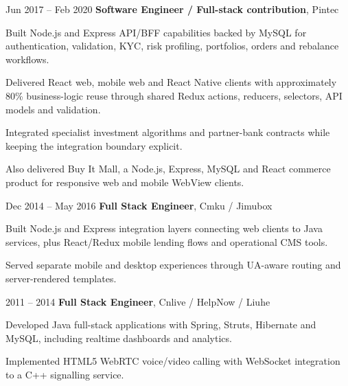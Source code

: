 \documentclass[10pt, letterpaper]{article}
\begin{document}
        \vspace{0.2 cm}
        \begin{twocolentry}{Jun 2017 -- Feb 2020}
            \textbf{Software Engineer / Full-stack contribution}, Pintec
        \end{twocolentry}
        \begin{onecolentry}
            \begin{highlights}
                \item Built Node.js and Express API/BFF capabilities backed by MySQL for authentication, validation, KYC, risk profiling, portfolios, orders and rebalance workflows.
                \item Delivered React web, mobile web and React Native clients with approximately 80\% business-logic reuse through shared Redux actions, reducers, selectors, API models and validation.
                \item Integrated specialist investment algorithms and partner-bank contracts while keeping the integration boundary explicit.
                \item Also delivered Buy It Mall, a Node.js, Express, MySQL and React commerce product for responsive web and mobile WebView clients.
            \end{highlights}
        \end{onecolentry}

        \vspace{0.2 cm}
        \begin{twocolentry}{Dec 2014 -- May 2016}
            \textbf{Full Stack Engineer}, Cmku / Jimubox
        \end{twocolentry}
        \begin{onecolentry}
            \begin{highlights}
                \item Built Node.js and Express integration layers connecting web clients to Java services, plus React/Redux mobile lending flows and operational CMS tools.
                \item Served separate mobile and desktop experiences through UA-aware routing and server-rendered templates.
            \end{highlights}
        \end{onecolentry}

        \vspace{0.2 cm}
        \begin{twocolentry}{2011 -- 2014}
            \textbf{Full Stack Engineer}, Cnlive / HelpNow / Liuhe
        \end{twocolentry}
        \begin{onecolentry}
            \begin{highlights}
                \item Developed Java full-stack applications with Spring, Struts, Hibernate and MySQL, including realtime dashboards and analytics.
                \item Implemented HTML5 WebRTC voice/video calling with WebSocket integration to a C++ signalling service.
            \end{highlights}
        \end{onecolentry}
\end{document}
